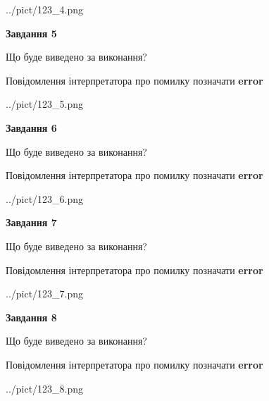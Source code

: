 \documentclass[12pt, ukrainian]{article}
\begin{document}
{\begin{center}
	{../pict/123_4.png}
\end{center}
\newpage

{\begin {center}\textbf{Завдання 5}\end {center}}\par
Що буде виведено за виконання? \par
Повідомлення інтерпретатора про помилку позначати \textbf{error}

\begin{center}
	{../pict/123_5.png}
\end{center}
\newpage

{\begin {center}\textbf{Завдання 6}\end {center}}\par
Що буде виведено за виконання? \par
Повідомлення інтерпретатора про помилку позначати \textbf{error}

\begin{center}
	{../pict/123_6.png}
\end{center}
\newpage

{\begin {center}\textbf{Завдання 7}\end {center}}\par
Що буде виведено за виконання? \par
Повідомлення інтерпретатора про помилку позначати \textbf{error}

\begin{center}
	{../pict/123_7.png}
\end{center}
\newpage

{\begin {center}\textbf{Завдання 8}\end {center}}\par
Що буде виведено за виконання? \par
Повідомлення інтерпретатора про помилку позначати \textbf{error}

\begin{center}
	{../pict/123_8.png}
\end{center}
\newpage

}
\end{document}
